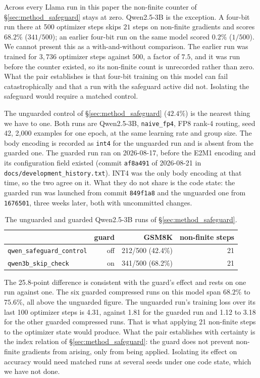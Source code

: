 \documentclass[11pt,letterpaper]{article}
\begin{document}
\medskip
\label{sec:safeguard_result}
Across every Llama run in this paper the non-finite counter of \S\ref{sec:method_safeguard} stays at zero. Qwen2.5-3B is the exception. A four-bit run there at 500 optimizer steps skips $21$ steps on non-finite gradients and scores $68.2\%$ ($341/500$); an earlier four-bit run on the same model scored $0.2\%$ ($1/500$). We cannot present this as a with-and-without comparison. The earlier run was trained for $3{,}736$ optimizer steps against $500$, a factor of $7.5$, and it was run before the counter existed, so its non-finite count is unrecorded rather than zero. What the pair establishes is that four-bit training on this model can fail catastrophically and that a run with the safeguard active did not. Isolating the safeguard would require a matched control.

The unguarded control of \S\ref{sec:method_safeguard} ($42.4\%$) is the nearest thing we have to one. Both runs are Qwen2.5-3B, \texttt{naive\_fp4}, FP8 rank-4 routing, seed 42, 2{,}000 examples for one epoch, at the same learning rate and group size. The body encoding is recorded as \texttt{int4} for the unguarded run and is absent from the guarded one. The guarded run ran on 2026-08-17, before the E2M1 encoding and its configuration field existed (commit \texttt{af8a491} of 2026-08-21 in \texttt{docs/development\_history.txt}). INT4 was the only body encoding at that time, so the two agree on it. What they do not share is the code state: the guarded run was launched from commit \texttt{849f1a8} and the unguarded one from \texttt{1676501}, three weeks later, both with uncommitted changes.

\begin{table}[htbp]
\centering
\small
\caption{The unguarded and guarded Qwen2.5-3B runs of \S\ref{sec:method_safeguard}.}
\label{tab:qwen_guard}
\begin{tabular}{lrrr}
\toprule
& guard & GSM8K & non-finite steps \\
\midrule
\texttt{qwen\_safeguard\_control} & off & 212/500 (42.4\%) & 21 \\
\texttt{qwen3b\_skip\_check}      & on  & 341/500 (68.2\%) & 21 \\
\bottomrule
\end{tabular}
\end{table}

The 25.8-point difference is consistent with the guard's effect and rests on one run against one. The six guarded compressed runs on this model span $68.2\%$ to $75.6\%$, all above the unguarded figure. The unguarded run's training loss over its last 100 optimizer steps is 4.31, against 1.81 for the guarded run and 1.12 to 3.18 for the other guarded compressed runs. That is what applying 21 non-finite steps to the optimizer state would produce. What the pair establishes with certainty is the index relation of \S\ref{sec:method_safeguard}: the guard does not prevent non-finite gradients from arising, only from being applied. Isolating its effect on accuracy would need matched runs at several seeds under one code state, which we have not done.
\end{document}

